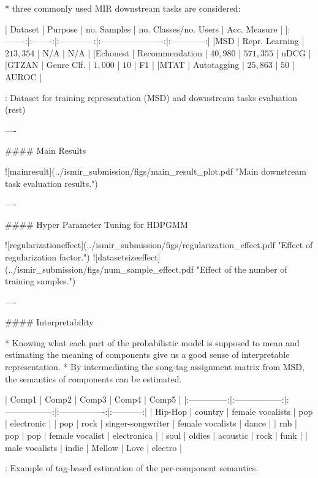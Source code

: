 \documentclass{beamer}
\begin{document}
\begin{frame}[fragile]
\begin{columns}[T]
\begin{column}{.46\textwidth}
\begin{markdown}
* three commonly used MIR downstream tasks are considered:

| Dataset | Purpose | no. Samples  | no. Classes/no. Users  | Acc. Measure |
|:-------:|:-------:|:------------:|:----------------------:|:------------:|
|MSD      | Repr. Learning | $213,354$ | N/A               | N/A          |
|Echonest | Recommendation | $40,980$  | $571,355$         | nDCG         |
|GTZAN    | Genre Clf. | $1,000$   | $10$              | F1           |
|MTAT     | Autotagging | $25,863$  | $50$              | AUROC        |

  : Dataset for training representation (MSD) and downstream tasks evaluation (rest)

----

#### Main Results

![mainresult](../ismir_submission/figs/main_result_plot.pdf "Main downstream task evaluation results.")

----

#### Hyper Parameter Tuning for HDPGMM

![regularizationeffect](../ismir_submission/figs/regularization_effect.pdf "Effect of regularization factor.")
![datasetsizeeffect](../ismir_submission/figs/num_sample_effect.pdf "Effect of the number of training samples.")

----


#### Interpretability

* Knowing what each part of the probabilistic model is supposed to mean and estimating the meaning of components give us a good sense of interpretable representation.
* By intermediating the song-tag assignment matrix from MSD, the semantics of components can be estimated.


|  Comp1         |  Comp2            |  Comp3            |  Comp4           | Comp5       |
|:--------------:|:-----------------:|:-----------------:|:----------------:|:-----------:|
| Hip-Hop        | country           | female vocalists  | pop              | electronic  |
| pop            | rock              | singer-songwriter | female vocalists | dance       |
| rnb            | pop               | pop               | female vocalist  | electronica |
| soul           | oldies            | acoustic          | rock             | funk        |
| male vocalists | indie             | Mellow            | Love             | electro     |

  : Example of tag-based estimation of the per-component semantics.


\end{markdown}
\end{column}
\end{columns}
\end{frame}
\end{document}
